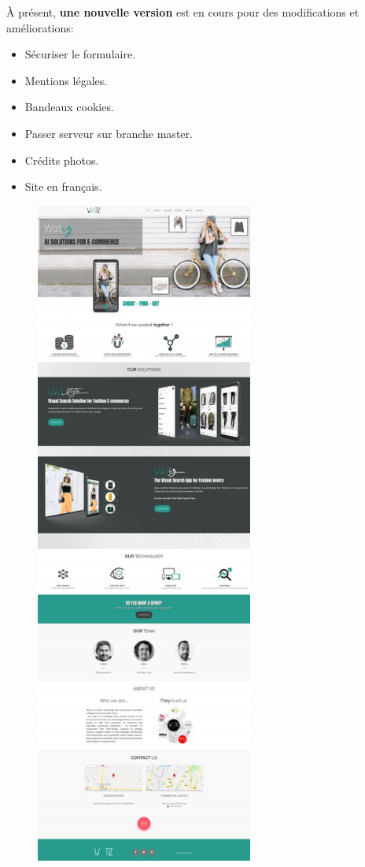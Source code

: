 \documentclass[a4paper, 12pt]{report}
\begin{document}
À présent, \textbf{une nouvelle version} est en cours pour des modifications et améliorations:
\begin{itemize}
\item Sécuriser le formulaire. 
\item Mentions légales. 
\item Bandeaux cookies.
\item Passer serveur sur branche master.
\item Crédits photos.
\item Site en français.
\end{itemize} 
\begin{figure}[t]
\begin{minipage}{0.5\linewidth}
\includegraphics[height=22cm]{images/SiteActuelle.jpg}

\end{minipage}
\end{figure}
\end{document}

